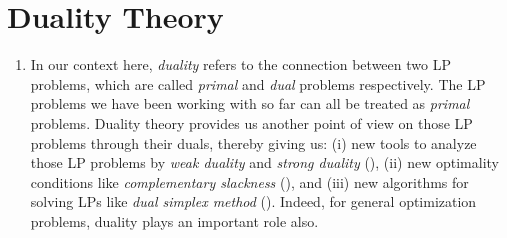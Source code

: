 \section{Duality Theory}
\label{sect:duality}
\begin{enumerate}
\item In our context here, \emph{duality} refers to the connection between two
LP problems, which are called \emph{primal} and \emph{dual} problems
respectively. The LP problems we have been working with so far can all be
treated as \emph{primal} problems. Duality theory provides us another point of
view on those LP problems through their duals, thereby giving us: (i) new tools
to analyze those LP problems by \emph{weak duality} and \emph{strong duality}
(), (ii) new optimality conditions
like \emph{complementary slackness} (), and (iii)
new algorithms for solving LPs like \emph{dual simplex method}
().  Indeed, for general optimization
problems, duality plays an important role also.
\end{enumerate}
